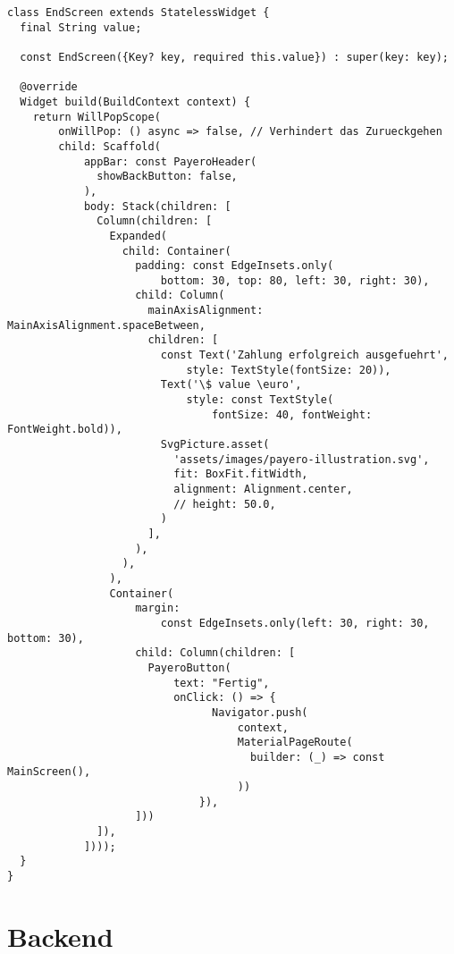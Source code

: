\begin{lstlisting}[caption={EndScreen bei erfolgreichem Bezahlvorgang}]
  class EndScreen extends StatelessWidget {
  final String value;

  const EndScreen({Key? key, required this.value}) : super(key: key);

  @override
  Widget build(BuildContext context) {
    return WillPopScope(
        onWillPop: () async => false, // Verhindert das Zurueckgehen
        child: Scaffold(
            appBar: const PayeroHeader(
              showBackButton: false,
            ),
            body: Stack(children: [
              Column(children: [
                Expanded(
                  child: Container(
                    padding: const EdgeInsets.only(
                        bottom: 30, top: 80, left: 30, right: 30),
                    child: Column(
                      mainAxisAlignment: MainAxisAlignment.spaceBetween,
                      children: [
                        const Text('Zahlung erfolgreich ausgefuehrt',
                            style: TextStyle(fontSize: 20)),
                        Text('\$ value \euro',
                            style: const TextStyle(
                                fontSize: 40, fontWeight: FontWeight.bold)),
                        SvgPicture.asset(
                          'assets/images/payero-illustration.svg',
                          fit: BoxFit.fitWidth,
                          alignment: Alignment.center,
                          // height: 50.0,
                        )
                      ],
                    ),
                  ),
                ),
                Container(
                    margin:
                        const EdgeInsets.only(left: 30, right: 30, bottom: 30),
                    child: Column(children: [
                      PayeroButton(
                          text: "Fertig",
                          onClick: () => {
                                Navigator.push(
                                    context,
                                    MaterialPageRoute(
                                      builder: (_) => const MainScreen(),
                                    ))
                              }),
                    ]))
              ]),
            ])));
  }
}
\end{lstlisting}

\section{Backend}

